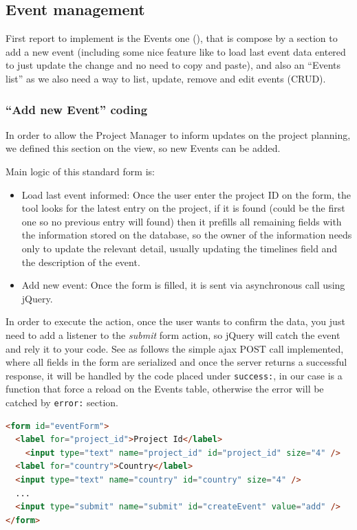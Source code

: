 \subsection{Event management}
First report to implement is the Events one (), that
is compose by a section to add a new event (including some nice feature like to
load last event data entered to just update the change and no need to copy and
paste), and also an ``Events list'' as we also need a way to list, update,
remove and edit events (CRUD).

\subsubsection{``Add new Event'' coding}
In order to allow the Project Manager to inform updates on the project planning,
we defined this section on the view, so new Events can be added.

Main logic of this standard form is:
\begin{itemize}
  \item Load last event informed: Once the user enter the project ID on the
  form, the tool looks for the latest entry on the project, if it is found
  (could be the first one so no previous entry will found) then it prefills all
  remaining fields with the information stored on the database, so the owner of
  the information needs only to update  the relevant detail, usually updating
  the timelines field and the description of the event.
  \item Add new event: Once the form is filled, it is sent via asynchronous call
  using jQuery.
\end{itemize}

In order to execute the action, once the user wants to confirm the data, you
just need to add a listener to the \emph{submit} form action, so jQuery will
catch the event and rely it to your code. See as follows the simple ajax POST
call implemented, where all fields in the form are serialized and once the
server returns a successful response, it will be handled by the code placed
under \texttt{success:}, in our case is a function that force a reload on the Events
table, otherwise the error will be catched by \texttt{error:} section.
\\

\begin{lstlisting}[language=HTML,breaklines=true,caption=Add\ new\ Event\
HTML\ code,label=f_migration_addnewevent_html]
<form id="eventForm">
  <label for="project_id">Project Id</label>
    <input type="text" name="project_id" id="project_id" size="4" />
  <label for="country">Country</label>
  <input type="text" name="country" id="country" size="4" /> 
  ...
  <input type="submit" name="submit" id="createEvent" value="add" />
</form>
\end{lstlisting}

